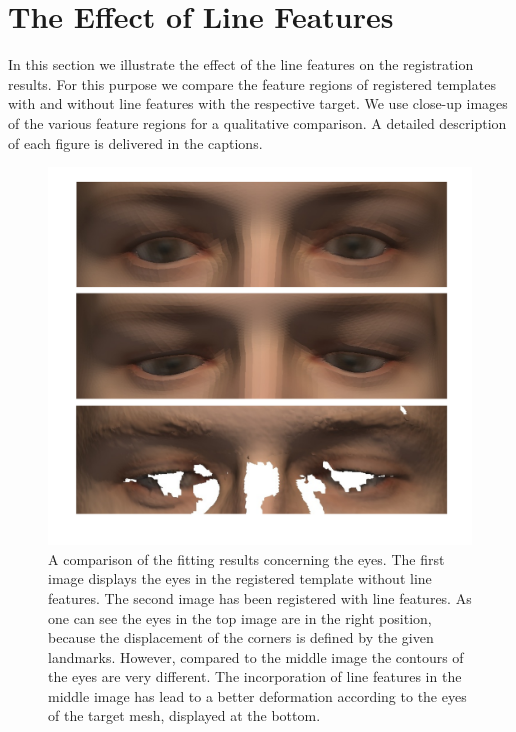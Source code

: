 \section{The Effect of Line Features}
In this section we illustrate the effect of the line features on the registration results.
For this purpose we compare the feature regions of registered templates with and without line features with the respective target. We use close-up images of the various feature regions for a qualitative comparison. A detailed description of each figure is delivered in the captions.
\begin{figure}[h!]
    \centering
    \includegraphics[width=.9\textwidth]{./resources/img/00029_eyes_comparison.pdf}
\caption{A comparison of the fitting results concerning the eyes. The first image displays the eyes in the registered template without line features. The second image has been registered with line features. As one can see the eyes in the top image are in the right position, because the displacement of the corners is defined by the given landmarks. However, compared to the middle image the contours of the eyes are very different. The incorporation of line features in the middle
image has lead to a better deformation according to the eyes of the target mesh, displayed at the bottom.}
\label{fig:fiteyes}
\end{figure}

